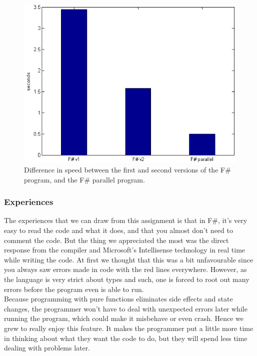 \documentclass[12pt, a4paper]{article}
\begin{document}
\begin{figure}[!h]
    \includegraphics[scale=0.7]{averageChart2}
    \centering
    \caption{Difference in speed between the first and second versions of the F\# program, and the F\# parallel program.}
\label{fig:averageChart2}
\end{figure}

\newpage

\subsubsection{Experiences}
The experiences that we can draw from this assignment is that in F\#, it's very easy to read the code and what it does, and that you almost don't need to comment the code. But the thing we appreciated the most was the direct response from the compiler and Microsoft's Intellisense technology in real time while writing the code. At first we thought that this was a bit unfavourable since you always saw errors made in code with the red lines everywhere. However, as the language is very strict about types and such, one is forced to root out many errors before the program even is able to run.\\

Because programming with pure functions eliminates side effects and state changes, the programmer won't have to deal with unexpected errors later while running the program, which could make it misbehave or even crash. Hence we grew to really enjoy this feature. It makes the programmer put a little more time in thinking about what they want the code to do, but they will spend less time dealing with problems later.\\
\end{document}
